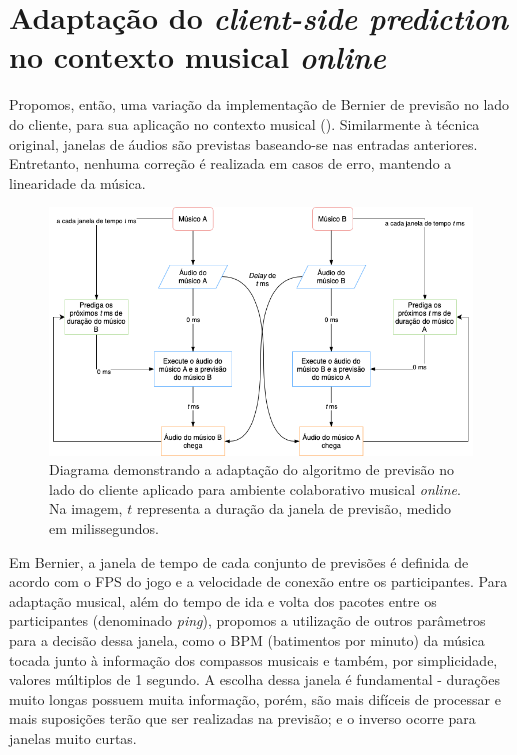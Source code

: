 \section{Adaptação do \textit{client-side prediction} no contexto musical \textit{online}}

Propomos, então, uma variação da implementação de Bernier \cite{client-side-prediction} de previsão no lado do cliente, para sua aplicação no contexto musical (). Similarmente à técnica original, janelas de áudios são previstas baseando-se nas entradas anteriores. Entretanto, nenhuma correção é realizada em casos de erro, mantendo a linearidade da música.

\begin{figure}[htbp]
\centering
\includegraphics[width=1\textwidth]{images/rollback-music.png}
\caption{Diagrama demonstrando a adaptação do algoritmo de previsão no lado do cliente aplicado para ambiente colaborativo musical \textit{online}. Na imagem, $t$ representa a duração da janela de previsão, medido em milissegundos.}
\label{fig:rollback_music_diagram}
\end{figure}

Em Bernier, a janela de tempo de cada conjunto de previsões é definida de acordo com o FPS do jogo e a velocidade de conexão entre os participantes. Para adaptação musical, além do tempo de ida e volta dos pacotes entre os participantes (denominado \textit{ping}), propomos a utilização de outros parâmetros para a decisão dessa janela, como o BPM (batimentos por minuto) da música tocada junto à informação dos compassos musicais e também, por simplicidade, valores múltiplos de 1 segundo. A escolha dessa janela é fundamental - durações muito longas possuem muita informação, porém, são mais difíceis de processar e mais suposições terão que ser realizadas na previsão; e o inverso ocorre para janelas muito curtas.

